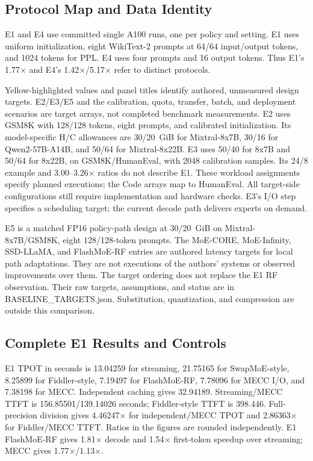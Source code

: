 \documentclass[conference,9pt,letterpaper]{IEEEtran}
\begin{document}
\subsection{Protocol Map and Data Identity}
E1 and E4 use committed single A100 runs, one per policy and setting. E1 uses uniform initialization, eight WikiText-2 prompts at 64/64 input/output tokens, and 1024 tokens for PPL. E4 uses four prompts and 16 output tokens. Thus E1's 1.77$\times$ and E4's 1.42$\times$/5.17$\times$ refer to distinct protocols.

Yellow-highlighted values and panel titles identify authored, unmeasured design targets. E2/E3/E5 and the calibration, quota, transfer, batch, and deployment scenarios are target arrays, not completed benchmark measurements. E2 uses GSM8K with 128/128 tokens, eight prompts, and calibrated initialization. Its model-specific H/C allowances are 30/20~GiB for Mixtral-8x7B, 30/16 for Qwen2-57B-A14B, and 50/64 for Mixtral-8x22B. E3 uses 50/40 for 8x7B and 50/64 for 8x22B, on GSM8K/HumanEval, with 2048 calibration samples. Its 24/8 example and 3.00--3.26$\times$ ratios do not describe E1. These workload assignments specify planned executions; the Code arrays map to HumanEval. All target-side configurations still require implementation and hardware checks. E3's I/O step specifies a scheduling target; the current decode path delivers experts on demand.

E5 is a matched FP16 policy-path design at 30/20~GiB on Mixtral-8x7B/GSM8K, eight 128/128-token prompts. The MoE-CORE, MoE-Infinity, SSD-LLaMA, and FlashMoE-RF entries are authored latency targets for local path adaptations. They are not executions of the authors' systems or observed improvements over them. The target ordering does not replace the E1 RF observation. Their raw targets, assumptions, and status are in BASELINE\_TARGETS.json. Substitution, quantization, and compression are outside this comparison.

\subsection{Complete E1 Results and Controls}
E1 TPOT in seconds is 13.04259 for streaming, 21.75165 for SwapMoE-style, 8.25899 for Fiddler-style, 7.19497 for FlashMoE-RF, 7.78096 for MECC I/O, and 7.38198 for MECC. Independent caching gives 32.94189. Streaming/MECC TTFT is 156.85501/139.14026 seconds; Fiddler-style TTFT is 398.446. Full-precision division gives 4.46247$\times$ for independent/MECC TPOT and 2.86363$\times$ for Fiddler/MECC TTFT. Ratios in the figures are rounded independently. E1 FlashMoE-RF gives 1.81$\times$ decode and 1.54$\times$ first-token speedup over streaming; MECC gives 1.77$\times$/1.13$\times$.
\end{document}
